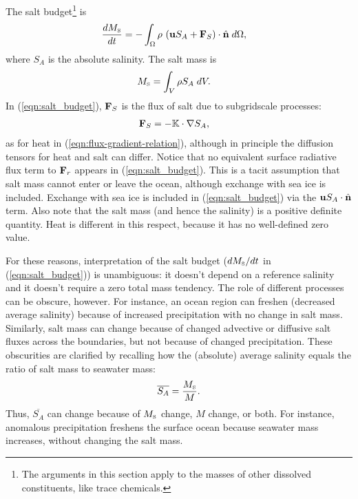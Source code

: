\documentclass[10pt]{amsart}
\newcommand{\surf}{\Omega}
\newcommand{\MS}{M_{\mbox{\tiny S}}}
\begin{document}
The salt budget\footnote{The arguments in this section apply to the masses of other dissolved constituents, like trace chemicals.} is
\begin{align}
\frac{d \MS}{d t} & = - \int_\surf \rho \, \left( {\bf u} S_A + {\bf F}_S \right) \cdot {\hat{\bf n}} \; d \surf ,
\label{eqn:salt_budget}
\end{align}
where $S_A$ is the absolute salinity.
The salt mass is 
\begin{align}
\MS & = \int_V \rho  S_A \; d V .
\label{eqn:salt_mass}
\end{align}
In (\ref{eqn:salt_budget}), ${\bf F}_S$ is the flux of salt due to subgridscale processes:
\begin{align}
{\bf F}_S & = - \mathbb{K} \cdot \nabla S_A, 
\label{eqn:flux-gradient-relation_salt}
\end{align}
as for heat in (\ref{eqn:flux-gradient-relation}), although in principle the diffusion tensors for heat and salt can differ.
Notice that no equivalent surface radiative flux term to ${\bf F}_{r}$ appears in (\ref{eqn:salt_budget}).
This is a tacit assumption that salt mass cannot enter or leave the ocean, although exchange with sea ice is included.
Exchange with sea ice is included in (\ref{eqn:salt_budget}) via the ${\bf u} S_A \cdot {\hat{\bf n}}$ term.
Also note that the salt mass (and hence the salinity) is a positive definite quantity. 
Heat is different in this respect, because it has no well-defined zero value.

For these reasons, interpretation of the salt budget ($d \MS / d t$ in (\ref{eqn:salt_budget})) is unambiguous: it doesn't depend on a reference salinity and it doesn't require a zero total mass tendency.
The role of different processes can be obscure, however.
For instance, an ocean region can freshen (decreased average salinity) because of increased precipitation with no change in salt mass. 
Similarly, salt mass can change because of changed advective or diffusive salt fluxes across the boundaries, but not because of changed precipitation.
These obscurities are clarified by recalling how the (absolute) average salinity equals the ratio of salt mass to seawater mass:
\begin{align}
\overline{S_A} = \frac{\MS}{M} .
\label{eqn:average_salinity}
\end{align}
Thus, $\overline{S_A}$ can change because of $\MS$ change, $M$ change, or both.
For instance, anomalous precipitation freshens the surface ocean because seawater mass increases, without changing the salt mass.
\end{document}
